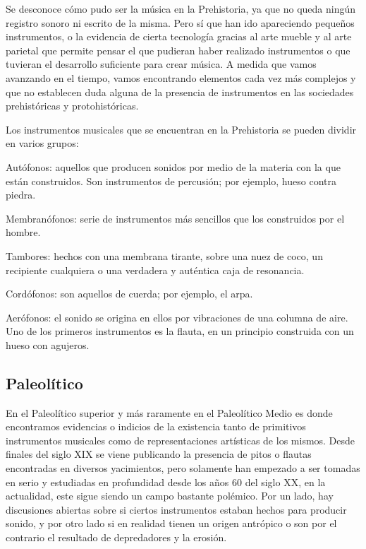 Se desconoce cómo pudo ser la música en la Prehistoria, ya que no queda ningún registro
sonoro ni escrito de la misma. Pero sí que han ido apareciendo pequeños instrumentos, o la
evidencia de cierta tecnología gracias al arte mueble y al arte parietal que permite
pensar el que pudieran haber realizado instrumentos o que tuvieran el desarrollo
suficiente para crear música. A medida que vamos avanzando en el tiempo, vamos encontrando
elementos cada vez más complejos y que no establecen duda alguna de la presencia de
instrumentos en las sociedades prehistóricas y protohistóricas.

Los instrumentos musicales que se encuentran en la Prehistoria se pueden dividir en varios
grupos:
 
Autófonos: aquellos que producen sonidos por medio de la materia con la que están
construidos. Son instrumentos de percusión; por ejemplo, hueso contra piedra.

Membranófonos: serie de instrumentos más sencillos que los construidos por el hombre.

Tambores: hechos con una membrana tirante, sobre una nuez de coco, un recipiente
cualquiera o una verdadera y auténtica caja de resonancia.

Cordófonos: son aquellos de cuerda; por ejemplo, el arpa.

Aerófonos: el sonido se origina en ellos por vibraciones de una columna de aire. Uno de
los primeros instrumentos es la flauta, en un principio construida con un hueso con
agujeros.


\subsection{Paleolítico}

En el Paleolítico superior y más raramente en el Paleolítico Medio es donde encontramos
evidencias o indicios de la existencia tanto de primitivos instrumentos musicales como de
representaciones artísticas de los mismos. Desde finales del siglo XIX se viene publicando
la presencia de pitos o flautas encontradas en diversos yacimientos, pero solamente han
empezado a ser tomadas en serio y estudiadas en profundidad desde los años 60 del siglo
XX, en la actualidad, este sigue siendo un campo bastante polémico. Por un lado, hay
discusiones abiertas sobre si ciertos instrumentos estaban hechos para producir sonido, y
por otro lado si en realidad tienen un origen antrópico o son por el contrario el
resultado de depredadores y la erosión.


